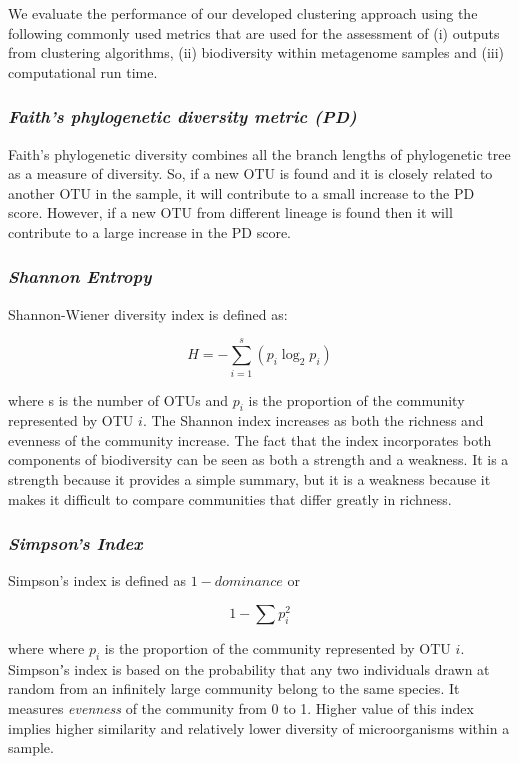 \documentclass[10pt, conference, compsocconf]{IEEEtran}
\begin{document}
We evaluate the performance of our developed clustering approach using 
the following commonly used metrics that are used 
for the assessment of (i) outputs from clustering algorithms, (ii) biodiversity
within metagenome samples and (iii) computational run time. 


\subsubsection{\textit{Faith’s phylogenetic diversity metric (PD)}}
Faith’s phylogenetic diversity \cite{MARfaith1992conservation} combines all 
the branch lengths of phylogenetic tree as a measure of diversity. So, if a new 
OTU is found and it is closely related to another OTU in the sample, it will contribute to 
a small increase to the PD score. However, if a new OTU from different lineage is found then it will contribute to a large increase in the PD score.

\subsubsection{\textit{Shannon Entropy}}

Shannon-Wiener diversity index is defined as:

\begin{equation}
H={-} \sum_{i=1}^{s} \left( p_i\log_2p_i \right)
\end{equation}

where s is the number of OTUs and $p_i$ is the proportion of the community represented by OTU $i$. The Shannon index increases as both the richness and evenness of the community increase. The fact that the index incorporates both components of biodiversity can be seen as both a strength and a weakness. It is a strength because it provides a simple summary, but it is a weakness because it makes it difficult to compare communities that differ greatly in richness.


\subsubsection{\textit{Simpson's Index}}
Simpson’s index is defined as ${1-dominance}$ or

\begin{equation}
1 - \sum p_i^2
\end{equation}

where where $p_i$ is the proportion of the community represented by OTU $i$. Simpsonʼs index is based on the probability that any two individuals drawn at random from an infinitely large community belong to the same species. It measures \textit{evenness} of the community from 0 to 1. Higher value of this index implies higher similarity and relatively lower diversity of microorganisms within a sample.
\end{document}
